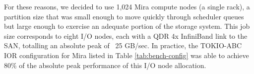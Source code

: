 For these reasons, we decided to use 1,024 Mira compute nodes (a single
rack), a partition size that was small enough to move quickly through
scheduler queues but large enough to exercise an adequate portion of the
storage system.  This job size corresponds to eight I/O nodes, each with a QDR 4x InfiniBand link to the SAN, totalling an absolute peak of ~25 GB/sec.
In practice, the TOKIO-ABC IOR configuration for Mira listed in Table \ref{tab:bench-config} was able to achieve 80\% of the absolute peak performance of this I/O node allocation.

